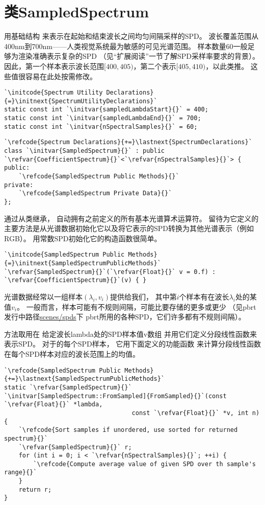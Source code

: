 \section{类SampledSpectrum}\label{sec:类SampledSpectrum}
用基础结构
来表示在起始和结束波长之间均匀间隔采样的SPD。
波长覆盖范围从400nm到700nm——人类视觉系统最为敏感的可见光谱范围。
样本数量60一般足够为渲染准确表示复杂的SPD
（见“扩展阅读”一节了解SPD采样率要求的背景）。
因此，第一个样本表示波长范围$[400,405)$，第二个表示$[405,410)$，以此类推。
这些值很容易在此处按需修改。
\begin{lstlisting}
`\initcode{Spectrum Utility Declarations}{=}\initnext{SpectrumUtilityDeclarations}`
static const int `\initvar{sampledLambdaStart}{}` = 400;
static const int `\initvar{sampledLambdaEnd}{}` = 700;
static const int `\initvar{nSpectralSamples}{}` = 60;
\end{lstlisting}
\begin{lstlisting}
`\refcode{Spectrum Declarations}{+=}\lastnext{SpectrumDeclarations}`
class `\initvar{SampledSpectrum}{}` : public `\refvar{CoefficientSpectrum}{}`<`\refvar{nSpectralSamples}{}`> {
public:
    `\refcode{SampledSpectrum Public Methods}{}`
private:
    `\refcode{SampledSpectrum Private Data}{}`
};
\end{lstlisting}

通过从类继承，
自动拥有之前定义的所有基本光谱算术运算符。
留待为它定义的主要方法是从光谱数据初始化它以及将它表示的SPD转换为其他光谱表示（例如RGB）。
用常数SPD初始化它的构造函数很简单。
\begin{lstlisting}
`\initcode{SampledSpectrum Public Methods}{=}\initnext{SampledSpectrumPublicMethods}`
`\refvar{SampledSpectrum}{}`(`\refvar{Float}{}` v = 0.f) : `\refvar{CoefficientSpectrum}{}`(v) { }
\end{lstlisting}

光谱数据经常以一组样本$(\lambda_i,v_i)$提供给我们，
其中第$i$个样本有在波长$\lambda_i$处的某值$v_i$。
一般而言，样本可能有不规则间隔，可能比要存储的更多或更少
（见pbrt发行中路径\href{https://pbrt.org/scenes-v3}{\ttfamily scenes/spds}下
pbrt所用的各种SPD，它们许多都有不规则间隔）。

方法取用在
给定波长{\ttfamily lambda}处的SPD样本值{\ttfamily v}数组
并用它们定义分段线性函数来表示SPD。
对于的每个SPD样本，
它用下面定义的功能函数
来计算分段线性函数在每个SPD样本对应的波长范围上的均值。
\begin{lstlisting}
`\refcode{SampledSpectrum Public Methods}{+=}\lastnext{SampledSpectrumPublicMethods}`
static `\refvar{SampledSpectrum}{}` `\initvar[SampledSpectrum::FromSampled]{FromSampled}{}`(const `\refvar{Float}{}` *lambda,
                                   const `\refvar{Float}{}` *v, int n) {
    `\refcode{Sort samples if unordered, use sorted for returned spectrum}{}`
    `\refvar{SampledSpectrum}{}` r;
    for (int i = 0; i < `\refvar{nSpectralSamples}{}`; ++i) {
        `\refcode{Compute average value of given SPD over th sample's range}{}`
    }
    return r;
}
\end{lstlisting}

